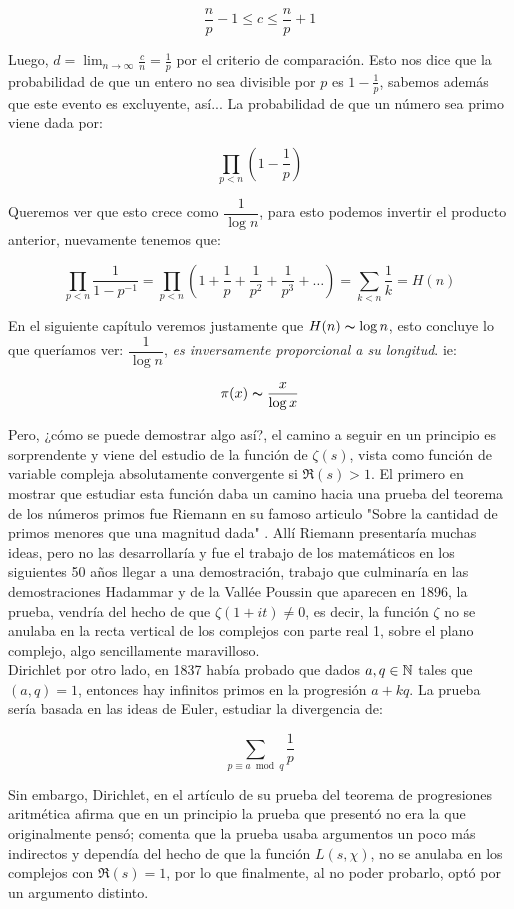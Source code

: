 $$\frac{n}{p}-1\leq c\leq\frac{n}{p}+1$$

Luego, $d=\lim_{n \to \infty}\frac{c}{n}=\frac{1}{p}$ por el criterio de comparación. Esto nos dice que la probabilidad de que un entero no sea divisible por $p$ es $1-\frac{1}{p}$, sabemos además que este evento es excluyente, así... La probabilidad de que un número sea primo viene dada por:

$$\displaystyle\prod_{p<n}\left( 1-\frac{1}{p} \right)$$

Queremos ver que esto crece como $\dfrac{1}{\log n}$, para esto podemos invertir el producto anterior, nuevamente tenemos que:

$$\prod_{p<n} \dfrac{1}{1-p^{-1}}=\prod_{p<n} \left(1+\dfrac{1}{p}+\dfrac{1}{p^2}+\dfrac{1}{p^3}+\ldots\right)=\sum_{k<n}\frac{1}{k}=H(n)$$

En el siguiente capítulo veremos justamente que $H(n)\thicksim \log n$, esto concluye lo que queríamos ver:  $\dfrac{1}{\log n}$, \textit{es inversamente proporcional a su longitud}. ie:

 $$\pi(x)\thicksim \dfrac{x}{\log x}$$

Pero, ¿cómo se puede demostrar algo así?, el camino a seguir en un principio es sorprendente y viene del estudio de la función de $\zeta(s)$, vista como función de variable compleja absolutamente convergente si $\Re(s)>1$. El primero en mostrar que estudiar esta función daba un camino hacia una prueba del teorema de los números primos fue Riemann en su famoso articulo "Sobre la cantidad de primos menores que una magnitud dada" \cite{riemann1990ueber}. Allí Riemann presentaría muchas ideas, pero no las desarrollaría y fue el trabajo de los matemáticos en los siguientes 50 años llegar a una demostración, trabajo que culminaría en las demostraciones Hadammar y de la Vallée Poussin que aparecen en 1896, la prueba, vendría del hecho de que $\zeta(1+it)\neq 0$, es decir, la función $\zeta$ no se anulaba en la recta vertical de los complejos con parte real 1, sobre el plano complejo, algo sencillamente maravilloso.\\

Dirichlet por otro lado, en 1837 había probado que dados $a,q \in \mathbb{N}$ tales que $(a,q)=1$, entonces hay infinitos primos en la progresión $a+kq$. La prueba sería basada en las ideas de Euler, estudiar  la divergencia de:

$$\sum_{p \equiv a \bmod q}\frac{1}{p}$$

Sin embargo, Dirichlet, en el artículo de su prueba del teorema de progresiones aritmética afirma que en un principio la prueba que presentó no era la que originalmente pensó; comenta que la prueba usaba argumentos un poco más indirectos y dependía del hecho de que la función $L(s,\chi)$, no se anulaba en los complejos con $\Re(s)=1$, por lo que finalmente, al no poder probarlo, optó por un argumento distinto.\\

